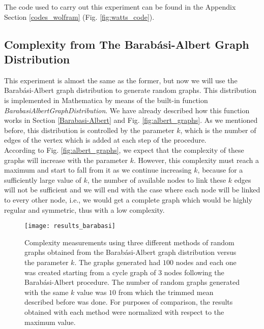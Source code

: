 The code used to carry out this experiment can be found in the Appendix Section \ref{codes_wolfram} (Fig. \ref{fig:watts_code}).

\subsection{Complexity from The Barabási-Albert Graph Distribution}
\label{barabasi_experiment_text}
This experiment is almost the same as the former, but now we will use the Barabási-Albert graph distribution to generate random graphs. This distribution is implemented in Mathematica by means of the built-in function \textit{BarabasiAlbertGraphDistribution}. We have already described how this function works in Section \ref{Barabasi-Albert} and Fig. \ref{fig:albert_graphs}. As we mentioned before, this distribution is controlled by the parameter $k$, which is the number of edges of the vertex which is added at each step of the procedure.\\

According to Fig. \ref{fig:albert_graphs}, we expect that the complexity of these graphs will increase with the parameter $k$. However, this complexity must reach a maximum and start to fall from it as we continue increasing $k$, because for a sufficiently large value of $k$, the number of available nodes to link these $k$ edges will not be sufficient and we will end with the case where each node will be linked to every other node, i.e., we would get a complete graph which would be highly regular and symmetric, thus with a low complexity.\\

\begin{figure}
\centering
\texttt{[image: results\_barabasi]}
\caption[Complexity measurements using three different methods of random graphs obtained from the Barabási-Albert graph distribution.]{Complexity measurements using three different methods of random graphs obtained from the Barabási-Albert graph distribution versus the parameter $k$. The graphs generated had $100$ nodes and each one was created starting from a cycle graph of $3$ nodes following the Barabási-Albert procedure. The number of random graphs generated with the same $k$ value was $10$ from which the trimmed mean described before was done. For purposes of comparison, the results obtained with each method were normalized with respect to the maximum value.}
\label{fig:results_barabasi}
\end{figure}

